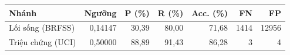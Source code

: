 \begin{tabular}{@{}lrrrrrr@{}}
\toprule
\textbf{Nhánh} & \textbf{Ngưỡng} & \textbf{P (\%)} & \textbf{R (\%)} & \textbf{Acc. (\%)} & \textbf{FN} & \textbf{FP}\\
\midrule
Lối sống (BRFSS) & 0,14147 & 30,39 & 80,00 & 71,68 & 1414 & 12956 \\
Triệu chứng (UCI) & 0,50000 & 88,89 & 91,43 & 86,28 & 3 & 4 \\
\bottomrule
\end{tabular}
